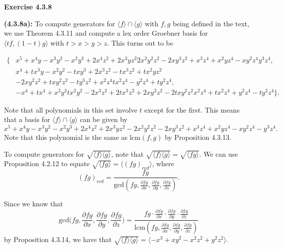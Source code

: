\documentclass[12pt,oneside]{article}
\newenvironment{exercise}[1]{\vspace{.1in}\noindent\textbf{Exercise #1 \hspace{.05em}}}{}
\begin{document}
\begin{exercise}{4.3.8}
    
    \bigskip
    \textbf{(4.3.8a):}
    To compute generators for $\langle f \rangle \cap \langle g \rangle$ with $f,g$ being 
    defined in the text, we use Theorem 4.3.11 and compute a lex order Groebner basis for
    $\langle tf, (1-t)g \rangle$ with $t>x>y>z$. This turns out to be 
    
    \begin{align*}
    \{&x^5 + x^4 y - x^3 y^2 - x^2 y^3 + 2 x^4 z^2 + 2 x^3 y z^2 2 x^2 y^2 z^2 - 2 x y^3 z^2 + x^3 z^4 + x^2 y z^4 - x y^2 z^4 y^3 z^4,\\&x^4 + t x^3 y - x^2 y^2 - t x y^3 + 2 x^3 z^2 - t x^3 z^2 + t x^2 y z^2 \\&- 2 x y^2 z^2 + t x y^2 z^2 - t y^3 z^2 + x^2 z^4 t x^2 z^4 - y^2 z^4 + t y^2 z^4,\\&-x^4 + t x^4 + x^2 y^2 t x^2 y^2 - 2 x^3 z^2 + 2 t x^3 z^2 + 2 x y^2 z^2 - 2 t x y^2 z^2 x^2 z^4 + t x^2 z^4 + y^2 z^4 - t y^2 z^4\}.
    \end{align*}
    
    Note that all polynomials in this set involve $t$ except for the first. This means that 
    a basis for $\langle f \rangle \cap \langle g \rangle$ can be given by 
    \[
        x^5+x^4y-x^3y^2-x^2y^3+2x^4z^2+2x^3yz^2-2x^2y^2z^2-2xy^3z^2+x^3z^4+x^2yz^4-xy^2z^4-y^3z^4.
    \]
    Note that this polynomial is the same as lcm$(f,g)$ by Proposition 4.3.13.
    
    To compute generators for $\sqrt{\langle f \rangle \langle g \rangle}$, note that 
    $\sqrt{\langle f \rangle \langle g \rangle} = \sqrt{\langle fg \rangle}$. We can 
    use Proposition 4.2.12 to equate 
    $\sqrt{\langle fg \rangle} = \langle (fg)_{red} \rangle$, where 
    \[
        (fg)_{red} = \frac{fg}{\text{gcd}(fg,\frac{\partial fg}{\partial x},\frac{\partial fg}{\partial y},\frac{\partial fg}{\partial z})}.
    \]
    
    Since we know that
    \[
        \text{gcd}\biggr(fg,\frac{\partial fg}{\partial x},\frac{\partial fg}{\partial y},\frac{\partial fg}{\partial z}\biggr) = \frac{fg\cdot\frac{\partial fg}{\partial x}\cdot\frac{\partial fg}{\partial y}\cdot\frac{\partial fg}{\partial z}}{\text{lcm}(fg,\frac{\partial fg}{\partial x},\frac{\partial fg}{\partial y},\frac{\partial fg}{\partial z})}
    \]
    by Proposition 4.3.14, we have that 
    $\sqrt{\langle f \rangle \langle g \rangle} = \langle -x^3+xy^2-x^2z^2+y^2z^2 \rangle$.
        

\end{exercise}
\end{document}

